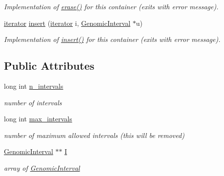 \begin{DoxyCompactItemize}
\begin{DoxyCompactList}\small\item\em Implementation of \hyperlink{classGenomicIntervalSetAsArray_a0f8554cfca150d695d15691aa42df7fa}{erase()} for this container (exits with error message). \end{DoxyCompactList}\item 
\hypertarget{classGenomicIntervalSetAsArray_a0cd89244c0e75b88f9b56c9b9478d06b}{
\hyperlink{classGenomicInterval}{iterator} \hyperlink{classGenomicIntervalSetAsArray_a0cd89244c0e75b88f9b56c9b9478d06b}{insert} (\hyperlink{classGenomicInterval}{iterator} i, \hyperlink{classGenomicInterval}{GenomicInterval} $\ast$u)}
\label{classGenomicIntervalSetAsArray_a0cd89244c0e75b88f9b56c9b9478d06b}

\begin{DoxyCompactList}\small\item\em Implementation of \hyperlink{classGenomicIntervalSetAsArray_a0cd89244c0e75b88f9b56c9b9478d06b}{insert()} for this container (exits with error message). \end{DoxyCompactList}\end{DoxyCompactItemize}
\subsection*{Public Attributes}
\begin{DoxyCompactItemize}
\item 
\hypertarget{classGenomicIntervalSetAsArray_a9f9558bbaa8d682993a60fa142893998}{
long int \hyperlink{classGenomicIntervalSetAsArray_a9f9558bbaa8d682993a60fa142893998}{n\_\-intervals}}
\label{classGenomicIntervalSetAsArray_a9f9558bbaa8d682993a60fa142893998}

\begin{DoxyCompactList}\small\item\em number of intervals \end{DoxyCompactList}\item 
\hypertarget{classGenomicIntervalSetAsArray_a6580b875cd9804ba59f88c5000f83f09}{
long int \hyperlink{classGenomicIntervalSetAsArray_a6580b875cd9804ba59f88c5000f83f09}{max\_\-intervals}}
\label{classGenomicIntervalSetAsArray_a6580b875cd9804ba59f88c5000f83f09}

\begin{DoxyCompactList}\small\item\em number of maximum allowed intervals (this will be removed) \end{DoxyCompactList}\item 
\hypertarget{classGenomicIntervalSetAsArray_af7ec8bbfea7748695aa35e6ec467a4b2}{
\hyperlink{classGenomicInterval}{GenomicInterval} $\ast$$\ast$ \hyperlink{classGenomicIntervalSetAsArray_af7ec8bbfea7748695aa35e6ec467a4b2}{I}}
\label{classGenomicIntervalSetAsArray_af7ec8bbfea7748695aa35e6ec467a4b2}

\begin{DoxyCompactList}\small\item\em array of \hyperlink{classGenomicInterval}{GenomicInterval} \end{DoxyCompactList}\end{DoxyCompactItemize}


